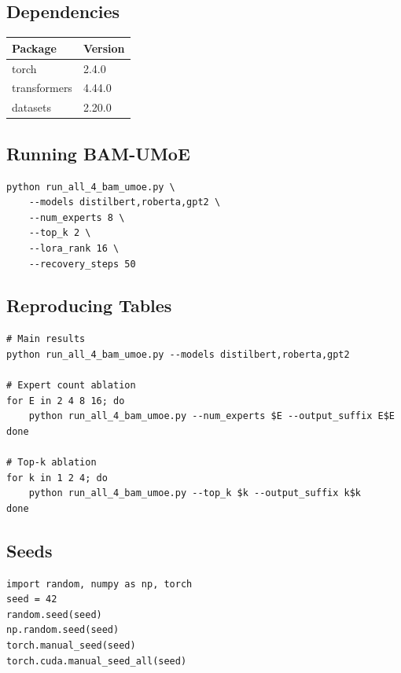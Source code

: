 \subsection{Dependencies}

\begin{table}[H]
\centering
\small
\begin{tabular}{ll}
\toprule
\textbf{Package} & \textbf{Version} \\
\midrule
torch & 2.4.0 \\
transformers & 4.44.0 \\
datasets & 2.20.0 \\
\bottomrule
\end{tabular}
\end{table}

\subsection{Running BAM-UMoE}

\begin{lstlisting}
python run_all_4_bam_umoe.py \
    --models distilbert,roberta,gpt2 \
    --num_experts 8 \
    --top_k 2 \
    --lora_rank 16 \
    --recovery_steps 50
\end{lstlisting}

\subsection{Reproducing Tables}

\begin{lstlisting}
# Main results
python run_all_4_bam_umoe.py --models distilbert,roberta,gpt2

# Expert count ablation
for E in 2 4 8 16; do
    python run_all_4_bam_umoe.py --num_experts $E --output_suffix E$E
done

# Top-k ablation
for k in 1 2 4; do
    python run_all_4_bam_umoe.py --top_k $k --output_suffix k$k
done
\end{lstlisting}

\subsection{Seeds}

\begin{lstlisting}
import random, numpy as np, torch
seed = 42
random.seed(seed)
np.random.seed(seed)
torch.manual_seed(seed)
torch.cuda.manual_seed_all(seed)
\end{lstlisting}

